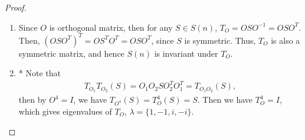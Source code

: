 \documentclass[11pt]{book}
\theoremstyle{definition}
\numberwithin{equation}{chapter}
\begin{document}
\begin{proof}
~\begin{enumerate}[label=(\alph*)]
    \item Since $O$ is orthogonal matrix, then for any $S \in S(n)$, $T_O = OSO^{-1} = OSO^T$. Then, $\left(OSO^T\right)^T = OS^TO^T = OSO^T$, since $S$ is symmetric. Thus, $T_O$ is also a symmetric matrix, and hence $S(n)$ is invariant under $T_O$.
    
    \item* Note that 
    \begin{align*}
        T_{O_1}T_{O_2}(S) = O_1 O_2 S O_2^T O_1^T = T_{O_1 O_2}(S),
    \end{align*}
    then by $O^4 = I$, we have $T_{O^4}(S) = T_{O}^4(S) = S$. Then we have $T_{O}^4 = I$, which gives eigenvalues of $T_O$, $\lambda = \{1, -1, i, -i\}$.
    

\end{enumerate}
\end{proof}
\end{document}
